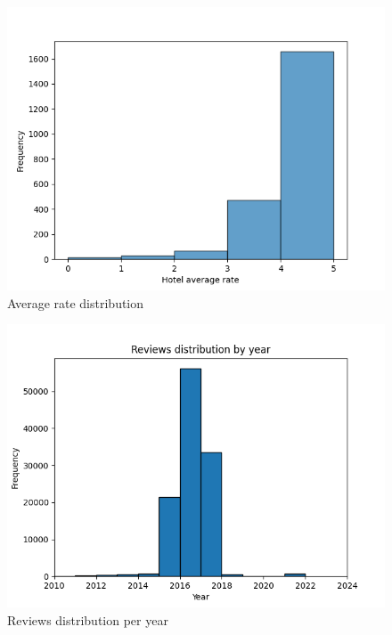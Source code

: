 \documentclass[sigconf]{acmart}
\begin{document}
\begin{figure}[H]
  \centering
  \includegraphics[width=\linewidth]{imgs/rating_distributions.png}
  \caption{Average rate distribution}
  \label{fig:averageRateDistribution}
\end{figure}

\begin{figure}[H]
  \centering
  \includegraphics[width=\linewidth]{imgs/date_distributions.png}
  \caption{Reviews distribution per year}
  \label{fig:reviewsDistributionYear}
\end{figure}
\end{document}
